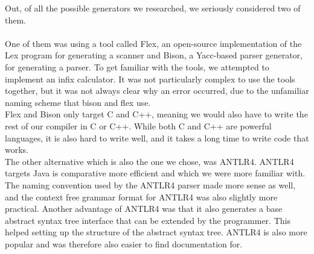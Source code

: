\noindent
Out, of all the possible generators we researched, we seriously considered two of them. \\
\\
One of them was using a tool called Flex, an open-source implementation of the Lex program for generating a scanner and Bison, a Yacc-based parser generator, for generating a parser. To get familiar with the tools, we attempted to implement an infix calculator. It was not particularly complex to use the tools together, but it was not always clear why an error occurred, due to the unfamiliar naming scheme that bison and flex use. \\
Flex and Bison only target C and C++, meaning we would also have to write the rest of our compiler in C or C++. While both C and C++ are powerful languages, it is also hard to write well, and it takes a long time to write code that works. \\
The other alternative which is also the one we chose, was ANTLR4. ANTLR4 targets Java is comparative more efficient and which we were more familiar with. The naming convention used by the ANTLR4 parser made more sense as well, and the context free grammar format for ANTLR4 was also slightly more practical. Another advantage of ANTLR4 was that it also generates a base abstract syntax tree interface that can be extended by the programmer. This helped setting up the structure of the abstract syntax tree. ANTLR4 is also more popular and was therefore also easier to find documentation for.









